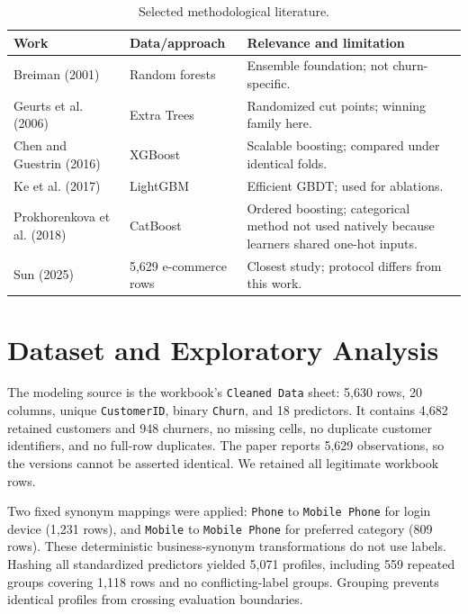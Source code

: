 \documentclass[11pt]{article}
\begin{document}
\begin{table}[H]\centering\small\setlength{\tabcolsep}{6pt}
\caption{Selected methodological literature.}\label{tab:lit}
\begin{tabular}{p{2.6cm}p{3.0cm}p{10.0cm}}\toprule
Work & Data/approach & Relevance and limitation \\\midrule
Breiman (2001) & Random forests & Ensemble foundation; not churn-specific.\\
Geurts et al. (2006) & Extra Trees & Randomized cut points; winning family here.\\
Chen and Guestrin (2016) & XGBoost & Scalable boosting; compared under identical folds.\\
Ke et al. (2017) & LightGBM & Efficient GBDT; used for ablations.\\
Prokhorenkova et al. (2018) & CatBoost & Ordered boosting; categorical method not used natively because learners shared one-hot inputs.\\
Sun (2025) & 5,629 e-commerce rows & Closest study; protocol differs from this work.\\
\bottomrule\end{tabular}
\end{table}

\section{Dataset and Exploratory Analysis}
The modeling source is the workbook's \texttt{Cleaned Data} sheet: 5,630 rows, 20 columns, unique \texttt{CustomerID}, binary \texttt{Churn}, and 18 predictors. It contains 4,682 retained customers and 948 churners, no missing cells, no duplicate customer identifiers, and no full-row duplicates. The paper reports 5,629 observations, so the versions cannot be asserted identical. We retained all legitimate workbook rows.

Two fixed synonym mappings were applied: \texttt{Phone} to \texttt{Mobile Phone} for login device (1,231 rows), and \texttt{Mobile} to \texttt{Mobile Phone} for preferred category (809 rows). These deterministic business-synonym transformations do not use labels. Hashing all standardized predictors yielded 5,071 profiles, including 559 repeated groups covering 1,118 rows and no conflicting-label groups. Grouping prevents identical profiles from crossing evaluation boundaries.
\end{document}
